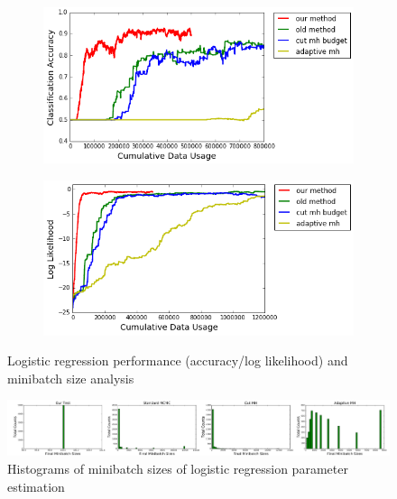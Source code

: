 \documentclass{article}
\begin{document}
\begin{figure}[t]
    \centering
    \begin{subfigure}{.5\textwidth}
     \centering
     \includegraphics[width=1\linewidth]{LogisticRegressionResult/acc_logistic}
\end{subfigure}%
\begin{subfigure}{.5\textwidth}
  \centering
  \includegraphics[width=1\linewidth]{LogisticRegressionResult/ll_logistic}
\end{subfigure}
\caption{Logistic regression performance (accuracy/log likelihood) and minibatch size analysis}
\label{fig:logistic_fig}
\vspace{-10pt}
\end{figure}

\begin{figure}[t]
	\centering
	\includegraphics[width=1\linewidth]{LogisticRegressionResult/minibatch_size_logistic.png}
	\caption{Histograms of minibatch sizes of logistic regression parameter estimation}
	\label{fig:logistic_minibatch}
\end{figure}
\end{document}
